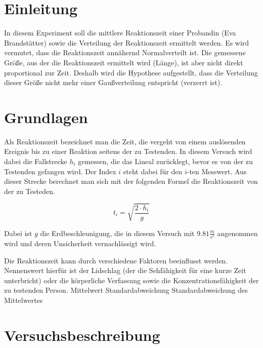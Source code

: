 \documentclass[a4paper,12pt]{article}
\begin{document}
\tableofcontents
\newpage


\section{Einleitung}

In diesem Experiment soll die mittlere Reaktionszeit einer Probandin (Eva Brandstätter) sowie die Verteilung 
der Reaktionszeit ermittelt werden. 
Es wird vermutet, dass die Reaktionszeit annähernd Normalverteilt ist. Die gemessene Größe, aus der die
Reaktionszeit ermittelt wird (Länge), ist aber nicht direkt proportional zur Zeit. Deshalb wird die 
Hypothese aufgestellt, dass die Verteilung dieser Größe nicht mehr einer Gaußverteilung entspricht (verzerrt ist).

\section{Grundlagen}

Als Reaktionszeit bezeichnet man die Zeit, die vergeht von einem auslösenden Ereignis bis zu einer Reaktion seitens der zu Testenden.
In diesem Versuch wird dabei die Fallstrecke $h_i$ gemessen, die das Lineal zurücklegt, bevor es von der zu Testenden gefangen wird.
Der Index $i$ steht dabei für den $i$-ten Messwert.  
Aus dieser Strecke berechnet man sich mit der folgenden Formel die Reaktionszeit von der zu Testeden.

\begin{equation}
    t_i = \sqrt{\frac{2 \cdot h_i}{g}}
\end{equation}

Dabei ist $g$ die Erdbeschleunigung, die in diesem Versuch mit $9.81 \frac{m}{s^2}$ angenommen wird und deren Unsicherheit
vernachlässigt wird. 

Die Reaktionszeit kann durch verschiedene Faktoren beeinflusst werden. Nennenswert hierfür ist der Lidschlag (der die Sehfähigkeit 
für eine kurze Zeit unterbricht) oder die körperliche Verfassung sowie die Konzentrationsfähigkeit der zu testenden Person.
Mittelwert
Standardabweichung
Standardabweichung des Mittelwertes


\section{Versuchsbeschreibung}
\end{document}
